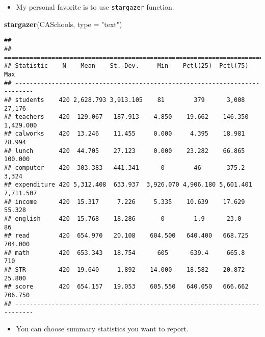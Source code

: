 \documentclass[]{book}
\newenvironment{Shaded}{\begin{snugshade}}{\end{snugshade}}
\newcommand{\DataTypeTok}[1]{\textcolor[rgb]{0.13,0.29,0.53}{#1}}
\newcommand{\KeywordTok}[1]{\textcolor[rgb]{0.13,0.29,0.53}{\textbf{#1}}}
\newcommand{\NormalTok}[1]{#1}
\newcommand{\OperatorTok}[1]{\textcolor[rgb]{0.81,0.36,0.00}{\textbf{#1}}}
\newcommand{\StringTok}[1]{\textcolor[rgb]{0.31,0.60,0.02}{#1}}
\providecommand{\tightlist}{%
  \setlength{\itemsep}{0pt}\setlength{\parskip}{0pt}}
\begin{document}
\begin{itemize}
\tightlist
\item
  My personal favorite is to use \texttt{stargazer} function.
\end{itemize}

\begin{Shaded}
\begin{Highlighting}[]
\KeywordTok{stargazer}\NormalTok{(CASchools, }\DataTypeTok{type =} \StringTok{"text"}\NormalTok{)}
\end{Highlighting}
\end{Shaded}

\begin{verbatim}
## 
## ===========================================================================
## Statistic    N    Mean    St. Dev.     Min    Pctl(25)  Pctl(75)     Max   
## ---------------------------------------------------------------------------
## students    420 2,628.793 3,913.105    81        379      3,008    27,176  
## teachers    420  129.067   187.913    4.850    19.662    146.350  1,429.000
## calworks    420  13.246    11.455     0.000     4.395    18.981    78.994  
## lunch       420  44.705    27.123     0.000    23.282    66.865    100.000 
## computer    420  303.383   441.341      0        46       375.2     3,324  
## expenditure 420 5,312.408  633.937  3,926.070 4,906.180 5,601.401 7,711.507
## income      420  15.317     7.226     5.335    10.639    17.629    55.328  
## english     420  15.768    18.286       0        1.9      23.0       86    
## read        420  654.970   20.108    604.500   640.400   668.725   704.000 
## math        420  653.343   18.754      605      639.4     665.8      710   
## STR         420  19.640     1.892    14.000    18.582    20.872    25.800  
## score       420  654.157   19.053    605.550   640.050   666.662   706.750 
## ---------------------------------------------------------------------------
\end{verbatim}

\begin{itemize}
\tightlist
\item
  You can choose summary statistics you want to report.
\end{itemize}

\begin{Shaded}
\end{Shaded}
\end{document}
